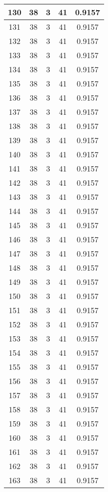 \documentclass[letterpaper, 12pt]{article}
\begin{document}
\begin{longtable}{|c|c|c|c|c|}
\hline
130 & 38 & 3 & 41 & 0.9157 \\
\hline
131 & 38 & 3 & 41 & 0.9157 \\
\hline
132 & 38 & 3 & 41 & 0.9157 \\
\hline
133 & 38 & 3 & 41 & 0.9157 \\
\hline
134 & 38 & 3 & 41 & 0.9157 \\
\hline
135 & 38 & 3 & 41 & 0.9157 \\
\hline
136 & 38 & 3 & 41 & 0.9157 \\
\hline
137 & 38 & 3 & 41 & 0.9157 \\
\hline
138 & 38 & 3 & 41 & 0.9157 \\
\hline
139 & 38 & 3 & 41 & 0.9157 \\
\hline
140 & 38 & 3 & 41 & 0.9157 \\
\hline
141 & 38 & 3 & 41 & 0.9157 \\
\hline
142 & 38 & 3 & 41 & 0.9157 \\
\hline
143 & 38 & 3 & 41 & 0.9157 \\
\hline
144 & 38 & 3 & 41 & 0.9157 \\
\hline
145 & 38 & 3 & 41 & 0.9157 \\
\hline
146 & 38 & 3 & 41 & 0.9157 \\
\hline
147 & 38 & 3 & 41 & 0.9157 \\
\hline
148 & 38 & 3 & 41 & 0.9157 \\
\hline
149 & 38 & 3 & 41 & 0.9157 \\
\hline
150 & 38 & 3 & 41 & 0.9157 \\
\hline
151 & 38 & 3 & 41 & 0.9157 \\
\hline
152 & 38 & 3 & 41 & 0.9157 \\
\hline
153 & 38 & 3 & 41 & 0.9157 \\
\hline
154 & 38 & 3 & 41 & 0.9157 \\
\hline
155 & 38 & 3 & 41 & 0.9157 \\
\hline
156 & 38 & 3 & 41 & 0.9157 \\
\hline
157 & 38 & 3 & 41 & 0.9157 \\
\hline
158 & 38 & 3 & 41 & 0.9157 \\
\hline
159 & 38 & 3 & 41 & 0.9157 \\
\hline
160 & 38 & 3 & 41 & 0.9157 \\
\hline
161 & 38 & 3 & 41 & 0.9157 \\
\hline
162 & 38 & 3 & 41 & 0.9157 \\
\hline
163 & 38 & 3 & 41 & 0.9157 \\

\end{longtable}
\end{document}
